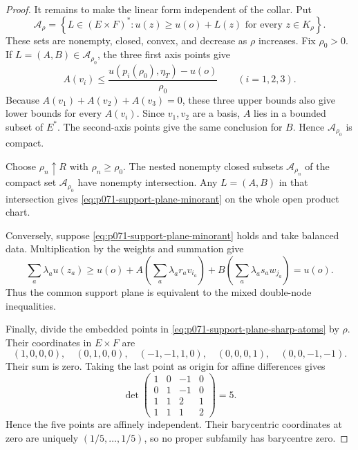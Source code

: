 \begin{proof}
It remains to make the linear form independent of the collar.  Put
\[
 \mathcal A_\rho=
 \left\{L\in(E\times F)^*:
       u(z)\geq u(o)+L(z)\text{ for every }z\in K_\rho\right\}.
\]
These sets are nonempty, closed, convex, and decrease as $\rho$ increases.
Fix $\rho_0>0$.  If $L=(A,B)\in\mathcal A_{\rho_0}$, the three first
axis points give
\[
 A(v_i)\leq
 \frac{u(p_i(\rho_0),\eta_T)-u(o)}{\rho_0}
 \qquad(i=1,2,3).
\]
Because $A(v_1)+A(v_2)+A(v_3)=0$, these three upper bounds also give lower
bounds for every $A(v_i)$.  Since $v_1,v_2$ are a basis, $A$ lies in a
bounded subset of $E^*$.  The second-axis points give the same conclusion
for $B$.  Hence $\mathcal A_{\rho_0}$ is compact.

Choose $\rho_n\uparrow R$ with $\rho_n\geq\rho_0$.  The nested nonempty
closed subsets $\mathcal A_{\rho_n}$ of the compact set
$\mathcal A_{\rho_0}$ have nonempty intersection.  Any
$L=(A,B)$ in that intersection gives
\eqref{eq:p071-support-plane-minorant} on the whole open product chart.

Conversely, suppose \eqref{eq:p071-support-plane-minorant} holds and take
balanced data.  Multiplication by the weights and summation give
\[
 \sum_a\lambda_au(z_a)
 \geq u(o)+
 A\left(\sum_a\lambda_ar_av_{i_a}\right)+
 B\left(\sum_a\lambda_as_aw_{j_a}\right)
 =u(o).
\]
Thus the common support plane is equivalent to the mixed double-node
inequalities.

Finally, divide the embedded points in
\eqref{eq:p071-support-plane-sharp-atoms} by $\rho$.  Their coordinates in
$E\times F$ are
\[
 (1,0,0,0),\quad (0,1,0,0),\quad (-1,-1,1,0),\quad
 (0,0,0,1),\quad (0,0,-1,-1).
\]
Their sum is zero.  Taking the last point as origin for affine differences
gives
\[
 \det
 \begin{pmatrix}
 1&0&-1&0\\
 0&1&-1&0\\
 1&1&2&1\\
 1&1&1&2
 \end{pmatrix}
 =5.
\]
Hence the five points are affinely independent.  Their barycentric
coordinates at zero are uniquely $(1/5,\ldots,1/5)$, so no proper
subfamily has barycentre zero.
\end{proof}
